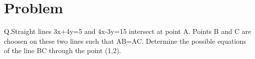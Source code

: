  \lstset{
frame=single, 
breaklines=true,
columns=fullflexible
}
\title{\mytitle}
\author{\myauthor\hspace{1em}\\\contact\\IITH\hspace{0.5em}-\hspace{0.5em}\mymodule}
\date{}
\hypersetup{pdfauthor=\myauthor,pdftitle=\mytitle,pdfkeywords=\mykeywords}
\sloppy

 \maketitle
 \tableofcontents
 
    
 

 
    
    
    
 
 \Large\section{Problem}
 Q.Straight lines 3x+4y=5 and 4x-3y=15 intersect at point A. Points B and C are choosen on these two lines such that AB=AC. Determine the possible equations of the line BC through the point (1,2).
 
